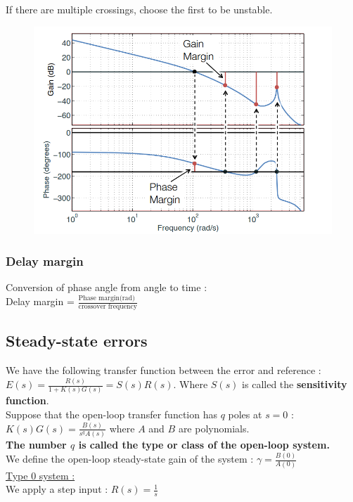 \documentclass[../main.tex]{subfiles}
\begin{document}
\warning If there are multiple crossings, choose the first to be unstable.\\

\begin{figure}[hbt!]
    \centering
    \includegraphics[width=.6\textwidth]{IMAGES/control/freq.png}
\end{figure}

\subsubsection{Delay margin}
Conversion of phase angle from angle to time : \\
Delay margin = $\frac{\text{Phase margin(rad) }}{\text{crossover frequency}}$\\





\subsection{Steady-state errors}
We have the following transfer function between the error and reference : $E(s) = \frac{R(s)}{1+K(s)G(s)} = S(s) R(s)$. Where $S(s)$ is called the \textbf{sensitivity function}.\\

Suppose that the open-loop transfer function has $q$ poles at $s=0$ : $K(s)G(s) = \frac{B(s)}{s^q A(s)}$ where $A$ and $B$ are polynomials.\\

\textbf{The number $q$ is called the type or class of the open-loop system.}\\

We define the open-loop steady-state gain of the system : $\gamma = \frac{B(0)}{A(0)}$\\

\quad \underline{Type 0 system :}\\

We apply a step input : $R(s) = \frac{1}{s}$\\
\end{document}
